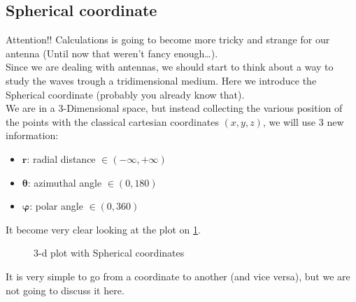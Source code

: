 \subsection*{Spherical coordinate}
Attention!! Calculations is going to become more tricky and strange for our antenna (Until now that weren't fancy enough\dots).\\
Since we are dealing with antennas, we should start to think about a way to study the waves trough a tridimensional medium. Here we introduce the Spherical coordinate (probably you already know that).\\
We are in a 3-Dimensional space, but instead collecting the various position of the points with the classical cartesian coordinates $(x,y,z)$, we will use 3 new information:
\begin{itemize}
    \item $\bm{r}$: radial distance $\in (-\infty,+\infty)$
    \item $\bm{\theta}$: azimuthal angle $\in (0,180)$
    \item $\bm{\varphi}$: polar angle $\in (0,360)$
\end{itemize}
It become very clear looking at the plot on \cref{fig:3d_plot}.
\begin{figure}[H]
    \begin{center}
    \end{center} \caption{3-d plot with Spherical coordinates}\label{fig:3d_plot} 
\end{figure}
It is very simple to go from a coordinate to another (and vice versa), but we are not going to discuss it here.
